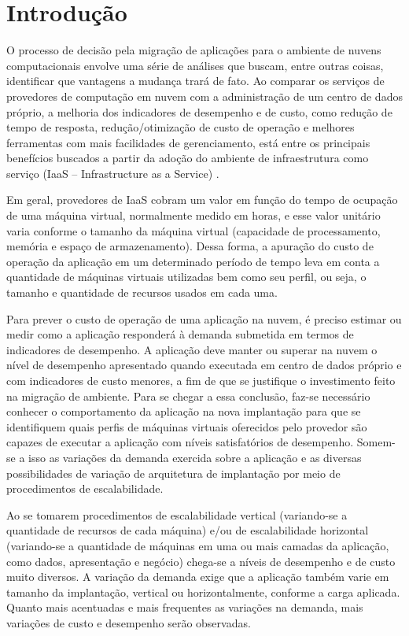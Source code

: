 \chapter[Introdução]{Introdução}
O processo de decisão pela migração de aplicações para o ambiente de nuvens computacionais 
envolve uma série de análises que buscam, entre outras coisas, identificar que vantagens a 
mudança trará de fato. Ao comparar os serviços de provedores de computação em nuvem com a 
administração de um centro de dados próprio, a melhoria dos indicadores de desempenho e de 
custo, como redução de tempo de resposta, redução/otimização de custo de operação e melhores 
ferramentas com mais facilidades de gerenciamento, está entre os principais benefícios buscados 
a partir da adoção do ambiente de infraestrutura como serviço (IaaS – Infrastructure as a Service)
\cite{li2011cloudprophet, rodero2010infrastructure}.

Em geral, provedores de IaaS cobram um valor em função do tempo de ocupação de uma máquina 
virtual, normalmente medido em horas, e esse valor unitário varia conforme o tamanho da máquina 
virtual (capacidade de processamento, memória e espaço de armazenamento). Dessa forma, a apuração 
do custo de operação da aplicação em um determinado período de tempo leva em conta a quantidade 
de máquinas virtuais utilizadas bem como seu perfil, ou seja, o tamanho e quantidade de recursos 
usados em cada uma.
 
Para prever o custo de operação de uma aplicação na nuvem, é preciso estimar ou medir como a 
aplicação responderá à demanda submetida em termos de indicadores de desempenho. A aplicação deve 
manter ou superar na nuvem o nível de desempenho apresentado quando executada em centro de dados 
próprio e com indicadores de custo menores, a fim de que se justifique o investimento feito na 
migração de ambiente. Para se chegar a essa conclusão, faz-se necessário conhecer o comportamento 
da aplicação na nova implantação para que se identifiquem quais perfis de máquinas virtuais 
oferecidos pelo provedor são capazes de executar a aplicação com níveis satisfatórios de desempenho. 
Somem-se a isso as variações da demanda exercida sobre a aplicação e as diversas possibilidades de 
variação de arquitetura de implantação por meio de procedimentos de escalabilidade.
 
Ao se tomarem procedimentos de escalabilidade vertical (variando-se a quantidade de recursos de 
cada máquina) e/ou de escalabilidade horizontal (variando-se a quantidade de máquinas em uma ou 
mais camadas da aplicação, como dados, apresentação e negócio) chega-se a níveis de desempenho e de custo muito 
diversos. A variação da demanda exige que a aplicação também varie em tamanho da implantação, 
vertical ou horizontalmente, conforme a carga aplicada. Quanto mais acentuadas e mais frequentes 
as variações na demanda, mais variações de custo e desempenho serão observadas.

